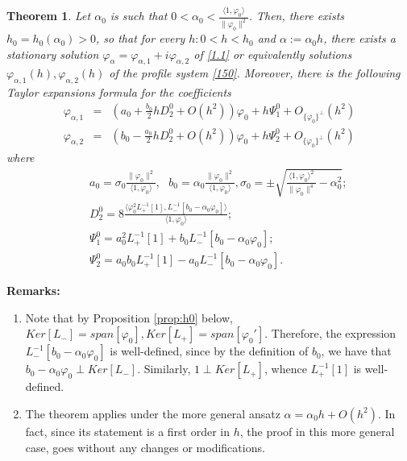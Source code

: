 \documentclass[12pt]{amsart}
\newtheorem{theorem}{Theorem}
\theoremstyle{definition}
\theoremstyle{remark}
\numberwithin{equation}{section}
\renewcommand{\(}{\left(}
\renewcommand{\)}{\right)}
\renewcommand{\[}{\left[}
\renewcommand{\]}{\right]}
\newcommand{\f}[2]{\frac{#1}{#2}}
\newcommand{\al}{\alpha}
\newcommand{\si}{\sigma}
\newcommand{\vp}{\varphi}
\newcommand{\dpr}[2]{\langle #1,#2 \rangle}
\begin{document}
  \begin{theorem}
  	\label{102}
  	Let $\al_0$ is such that $ 0<\al_0<\f{\dpr{1}{\vp_0}}{\|\vp_0\|^2}$. Then, there exists $h_0=h_0(\al_0)>0$, so that for every $h: 0<h<h_0$ and $\al:=\al_0 h$, there exists a stationary solution $\vp_{\al}=\vp_{\al,1}+i \vp_{\al,2}$ of
  	\eqref{1.1}  or equivalently  solutions $\vp_{\al,1}(h), \vp_{\al,2}(h)$ of the profile system   \eqref{150}. Moreover, there is the following Taylor expansions formula for the coefficients
  	\begin{eqnarray}
  	\label{500}
  	\vp_{\al,1} &=& (a_0+\f{b_0}{2} h D_2^0+O(h^2))  \vp_0+h \Psi_1^0 +O_{\{\vp_0\}^\perp}(h^2)\\
  	\label{510}
  	\vp_{\al,2} &=&  (b_0-\f{a_0}{2} h D_2^0+O(h^2))  \vp_0+h \Psi_2^0 +O_{\{\vp_0\}^\perp}(h^2)
  	\end{eqnarray}
  	where
  	\begin{eqnarray*}
  		& & a_0=\si_0  \f{\|\vp_0\|^2}{\dpr{1}{\vp_0}}, \ \ \ b_0= \al_0  \f{\|\vp_0\|^2} {\dpr{1}{\vp_0}},
  		\si_0=  \pm \sqrt{ \f{\dpr{1}{\vp_0}^2}{\|\vp_0\|^4}-\al_0^2}; \\
  			& & D_2^0 = 8 \f{\dpr{\vp_0^2 L_+^{-1}[1]}{L_-^{-1}[b_0-\al_0 \vp_0]}}{\dpr{1}{\vp_0}}; \\
  		& &  \Psi_1^0=  a_0^2 L_+^{-1}[1]  + b_0 L_-^{-1}[b_0-\al_0\vp_0];  \\
  		& & \Psi_2^0=  a_0 b_0  L_+^{-1}[1]  - a_0 L_-^{-1}[b_0-\al_0\vp_0].
  	\end{eqnarray*}
  \end{theorem}
  {\bf Remarks:}
  \begin{enumerate}
  	\item Note that by Proposition \ref{prop:h0} below, $Ker[L_-]=span[\vp_0], Ker[L_+]=span[\vp_0']$. Therefore,  the expression  $L_-^{-1}[b_0-\al_0\vp_0]$ is well-defined, since by the definition of $b_0$, we have that $b_0-\al_0\vp_0\perp Ker[L_-]$. Similarly, $1\perp Ker[L_+]$, whence $L_+^{-1}[1]$ is well-defined.
  	\item The theorem applies under the more general ansatz $\al=\al_0 h+O(h^2)$. In fact, since its statement is a first order in $h$, the proof in this more general case, goes without any changes or modifications.
  \end{enumerate}
\end{document}
